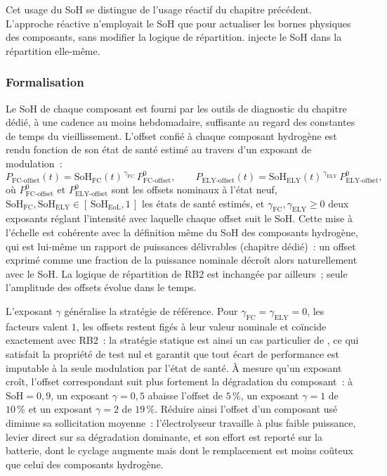 Cet usage du SoH se distingue de l'usage réactif du chapitre précédent. L'approche réactive n'employait le SoH que pour actualiser les bornes physiques des composants, sans modifier la logique de répartition. \RBsohH{} injecte le SoH dans la répartition elle-même.

\subsubsection{Formalisation}

Le SoH de chaque composant est fourni par les outils de diagnostic du chapitre dédié, à une cadence au moins hebdomadaire, suffisante au regard des constantes de temps du vieillissement. L'offset confié à chaque composant hydrogène est rendu fonction de son état de santé estimé au travers d'un exposant de modulation~:
\begin{equation}
\label{eq:rb2soh_offset}
P_{\text{FC-offset}}(t) = \mathrm{SoH}_{\text{FC}}(t)^{\,\gamma_{\text{FC}}}\,P_{\text{FC-offset}}^{0},
\qquad
P_{\text{ELY-offset}}(t) = \mathrm{SoH}_{\text{ELY}}(t)^{\,\gamma_{\text{ELY}}}\,P_{\text{ELY-offset}}^{0},
\end{equation}
où $P_{\text{FC-offset}}^{0}$ et $P_{\text{ELY-offset}}^{0}$ sont les offsets nominaux à l'état neuf, $\mathrm{SoH}_{\text{FC}}, \mathrm{SoH}_{\text{ELY}} \in [\,\mathrm{SoH}_{\text{EoL}}, 1\,]$ les états de santé estimés, et $\gamma_{\text{FC}}, \gamma_{\text{ELY}} \geq 0$ deux exposants réglant l'intensité avec laquelle chaque offset suit le SoH. Cette mise à l'échelle est cohérente avec la définition même du SoH des composants hydrogène, qui est lui-même un rapport de puissances délivrables (chapitre dédié)~: un offset exprimé comme une fraction de la puissance nominale décroît alors naturellement avec le SoH. La logique de répartition de RB2 est inchangée par ailleurs~; seule l'amplitude des offsets évolue dans le temps.

L'exposant $\gamma$ généralise la stratégie de référence. Pour $\gamma_{\text{FC}} = \gamma_{\text{ELY}} = 0$, les facteurs valent $1$, les offsets restent figés à leur valeur nominale et \RBsohH{} coïncide exactement avec RB2~: la stratégie statique est ainsi un cas particulier de \RBsohH, ce qui satisfait la propriété de test nul et garantit que tout écart de performance est imputable à la seule modulation par l'état de santé. À mesure qu'un exposant croît, l'offset correspondant suit plus fortement la dégradation du composant~: à $\mathrm{SoH} = 0{,}9$, un exposant $\gamma = 0{,}5$ abaisse l'offset de $5\,\%$, un exposant $\gamma = 1$ de $10\,\%$ et un exposant $\gamma = 2$ de $19\,\%$. Réduire ainsi l'offset d'un composant usé diminue sa sollicitation moyenne~: l'électrolyseur travaille à plus faible puissance, levier direct sur sa dégradation dominante, et son effort est reporté sur la batterie, dont le cyclage augmente mais dont le remplacement est moins coûteux que celui des composants hydrogène.

